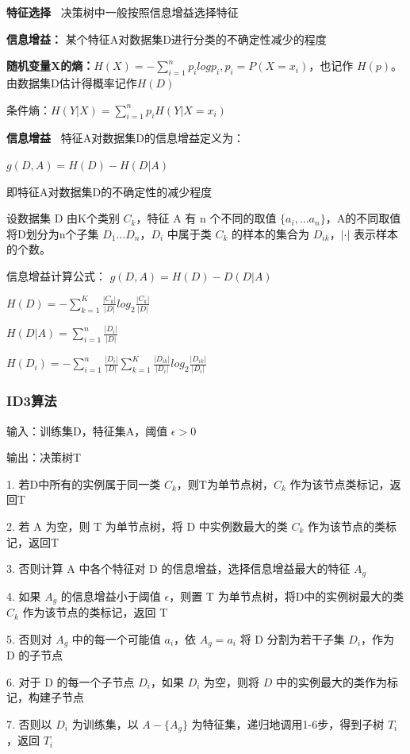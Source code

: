 \documentclass[b4paper, 10pt]{ctexart}
\begin{document}
\begin{multicols}{3}
\textbf{特征选择\ } 决策树中一般按照信息增益选择特征

\textbf{信息增益：} 某个特征A对数据集D进行分类的不确定性减少的程度

\textbf{随机变量X的熵：}$H(X)=-\sum_{i=1}^n p_ilogp_i, p_i=P(X=x_i)$，也记作 $H(p)$。由数据集D估计得概率记作$H(D)$

条件熵：$H(Y|X)=\sum_{i=1}^{n} p_i H(Y|X=x_i)$

\textbf{信息增益\ } 特征A对数据集D的信息增益定义为：

$g(D,A)=H(D)-H(D|A)$

即特征A对数据集D的不确定性的减少程度

设数据集 D 由K个类别 $C_k$，特征 A 有 n 个不同的取值 $\{a_i,\dots a_n \}$，A的不同取值将D划分为n个子集 $D_1\dots D_n$，$D_i$ 中属于类 $C_k$ 的样本的集合为 $D_{ik}$，$|\cdot|$ 表示样本的个数。

信息增益计算公式：
$
g(D,A) = H(D) - D(D|A)
$

$
H(D) = -\sum_{k=1}^K \frac{|C_k|}{|D|} log_2 \frac{|C_k|}{|D|}
$

$
H(D|A) = \sum_{i=1}^n \frac{|D_i|}{|D|} 
$

$
H(D_i)=-\sum_{i=1}^n \frac{|D_i|}{|D|}\sum_{k=1}^K \frac{|D_{ik}|}{|D_i|} log_2\frac{|D_{ik}|}{|D_i|}
$

\subsubsection{ID3算法}

输入：训练集D，特征集A，阈值 $\epsilon > 0$

输出：决策树T

1. 若D中所有的实例属于同一类 $C_k$，则T为单节点树，$C_k$ 作为该节点类标记，返回T

2. 若 A 为空，则 T 为单节点树，将 D 中实例数最大的类 $C_k$ 作为该节点的类标记，返回T

3. 否则计算 A 中各个特征对 D 的信息增益，选择信息增益最大的特征 $A_g$

4. 如果 $A_g$ 的信息增益小于阈值 $\epsilon$，则置 T 为单节点树，将D中的实例树最大的类 $C_k$ 作为该节点的类标记，返回 T

5. 否则对 $A_g$ 中的每一个可能值 $a_i$，依 $A_g=a_i$ 将 D 分割为若干子集 $D_i$，作为 D 的子节点

6. 对于 D 的每一个子节点 $D_i$，如果 $D_i$ 为空，则将 $D$ 中的实例最大的类作为标记，构建子节点

7. 否则以 $D_i$ 为训练集，以 $A-\{A_g\}$ 为特征集，递归地调用1-6步，得到子树 $T_i$，返回 $T_i$


\end{multicols}
\end{document}
